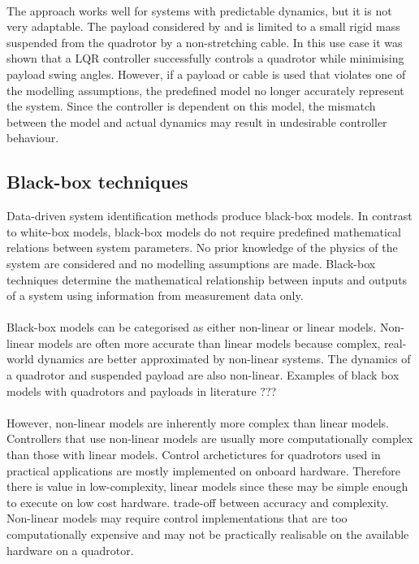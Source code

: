         \paragraph{} 
        The approach works well for systems with predictable dynamics, but it is not very adaptable.
        The payload considered by \cite{Erasmus2020} and \cite{Slabber2020} is limited to a small rigid mass suspended from the quadrotor by a non-stretching cable. 
        In this use case it was shown that a LQR controller successfully controls a quadrotor while minimising payload swing angles.
        However, if a payload or cable is used that violates one of the modelling assumptions, the predefined model no longer accurately represent the system.
        Since the controller is dependent on this model, the mismatch between the model and actual dynamics may result in undesirable controller behaviour.

    \subsection{Black-box techniques}

        Data-driven system identification methods produce black-box models.
        In contrast to white-box models, black-box models do not require predefined mathematical relations between system parameters.
        No prior knowledge of the physics of the system are considered and no modelling assumptions are made.
        Black-box techniques determine the mathematical relationship between inputs and outputs of a system using information from measurement data only.

        \paragraph{}
        Black-box models can be categorised as either non-linear or linear models.
        Non-linear models are often more accurate than linear models because complex, real-world dynamics are better approximated by non-linear systems.
        The dynamics of a quadrotor and suspended payload are also non-linear.
        Examples of black box models with quadrotors and payloads in literature ???

        \paragraph{}
        However, non-linear models are inherently more complex than linear models. 
        Controllers that use non-linear models are usually more computationally complex than those with linear models.
        Control archetictures for quadrotors used in practical applications are mostly implemented on onboard hardware.
        Therefore there is value in low-complexity, linear models since these may be simple enough to execute on low cost hardware.
        trade-off between accuracy and complexity.
        Non-linear models may require control implementations that are too computationally expensive and may not be practically realisable on the available hardware on a quadrotor.
        
